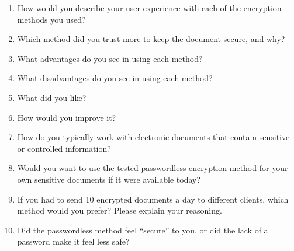 \begin{enumerate}
    \item How would you describe your user experience with each of the encryption methods you used?
    \item Which method did you trust more to keep the document secure, and why?
    \item What advantages do you see in using each method?
    \item What disadvantages do you see in using each method?
    \item What did you like?
    \item How would you improve it?
    \item How do you typically work with electronic documents that contain sensitive or controlled information?
    \item Would you want to use the tested passwordless encryption method for your own sensitive documents if it were available today?
    \item If you had to send 10 encrypted documents a day to different clients, which method would you prefer? Please explain your reasoning.
    \item Did the passwordless method feel ``secure'' to you, or did the lack of a password make it feel less safe?
\end{enumerate}
